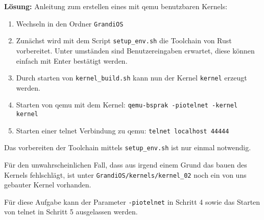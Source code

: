 \begin{description}
\textbf{Lösung:}
Anleitung zum erstellen eines mit qemu benutzbaren Kernels:
\begin{enumerate}
	\item Wechseln in den Ordner \texttt{GrandiOS}
	\item Zunächst wird mit dem Script \texttt{setup\_env.sh} die Toolchain von Rust vorbereitet. Unter umständen sind Benutzereingaben erwartet, diese können einfach mit Enter bestätigt werden.
	\item Durch starten von \texttt{kernel\_build.sh} kann nun der Kernel \texttt{kernel} erzeugt werden.
	\item Starten von qemu mit dem Kernel: \texttt{qemu-bsprak -piotelnet -kernel kernel}
	\item Starten einer telnet Verbindung zu qemu: \texttt{telnet localhost 44444}
\end{enumerate}
Das vorbereiten der Toolchain mittels \texttt{setup\_env.sh} ist nur einmal notwendig.

Für den unwahrscheinlichen Fall, dass aus irgend einem Grund das bauen des Kernels fehlschlägt, ist unter {\texttt{GrandiOS/kernels/kernel\_02}} noch ein von uns gebauter Kernel vorhanden.

Für diese Aufgabe kann der Parameter \texttt{-piotelnet} in Schritt 4 sowie das Starten von telnet in Schritt 5 ausgelassen werden.


\end{description}
